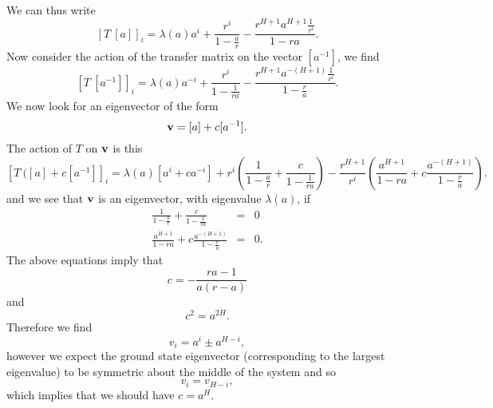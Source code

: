 We  can thus write
\begin{equation}
\left[T\ [a]\right]_i= \lambda(a)a^i +\frac{r^i}{1-\frac{a}{r}}-\frac{r^{H+1}a^{H+1}\frac{1}{r^i}}{1-ra}.
\end{equation}
Now consider the action of the transfer matrix on the vector $[a^{-1}]$, we find
\begin{equation}
\left[T\ [a^{-1}]\right]_i = \lambda(a) a^{-i} + \frac{r^i}{1-\frac{1}{ra}}-\frac{r^{H+1}a^{-(H+1)}\frac{1}{r^i}}{1-\frac{r}{a}}.
\end{equation}
We now look for an eigenvector of the form
\begin{equation}
{\bf v} = [a]+ c[a^{-1}].
\end{equation}
The action of $T$ on ${\bf v}$ is this
\begin{equation}
\left[T\ ([a]+c [a^{-1}]\right]_i = \lambda(a)[a^i + c a^{-i}]
+ r^i\left(\frac{1}{1-\frac{a}{r}}+ \frac{c}{1-\frac{1}{ra}}\right)
- \frac{r^{H+1}}{r^i}\left(\frac{a^{H+1}}{1-ra} + c\frac{a^{-(H+1)}}{1-\frac{r}{a}}\right).
\end{equation}
and we see that ${\bf v}$ is an eigenvector, with eigenvalue $\lambda(a)$,  if
\begin{eqnarray}
\frac{1}{1-\frac{a}{r}}+ \frac{c}{1-\frac{1}{ra}}&=&0 \\
\frac{a^{H+1}}{1-ra} + c\frac{a^{-(H+1)}}{1-\frac{r}{a}} &=&0.
\end{eqnarray}
The above equations imply that 
\begin{equation}
c= -\frac{ra-1}{a(r-a)}
\end{equation}
and
\begin{equation}
c^2 = a^{2H}.
\end{equation}
Therefore we find
\begin{equation}
v_i = a^i \pm a^{H-i},
\end{equation}
however we expect the ground state eigenvector (corresponding to the largest eigenvalue)  to be symmetric about the middle of the system and so 
\begin{equation}
v_i= v_{H-i},
\end{equation}
which implies that we should have
$c= a^H$. 


